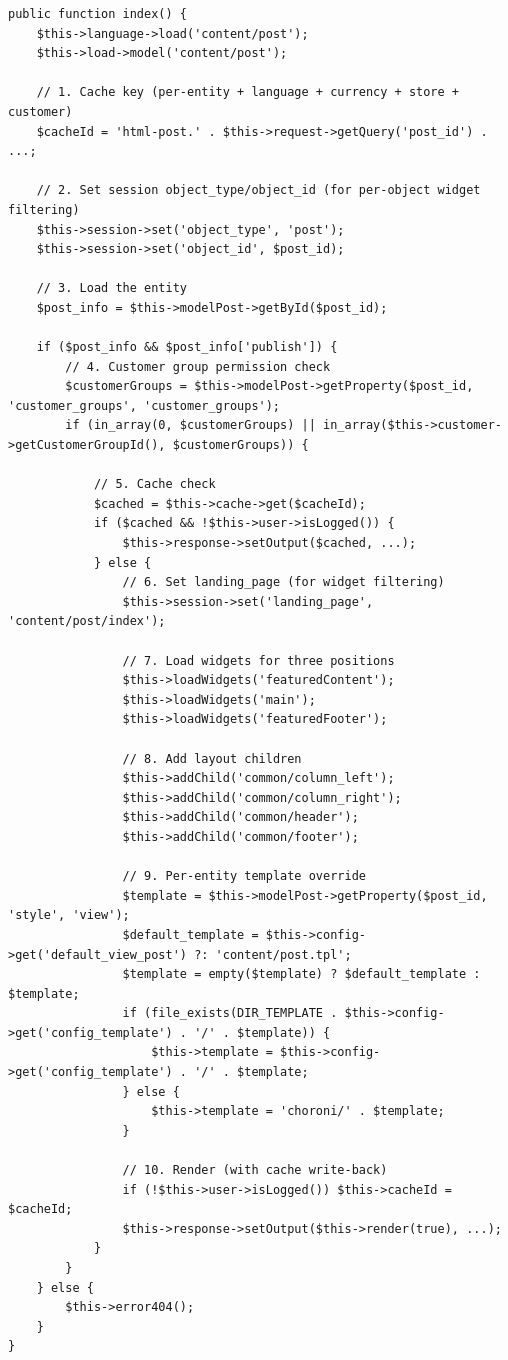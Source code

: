 \documentclass[11pt,a4paper]{article}
\begin{document}
\begin{lstlisting}[caption={The common CMS page pattern (abridged from \texttt{content/post.php}).},label={lst:cms-pattern}]
public function index() {
    $this->language->load('content/post');
    $this->load->model('content/post');

    // 1. Cache key (per-entity + language + currency + store + customer)
    $cacheId = 'html-post.' . $this->request->getQuery('post_id') . ...;

    // 2. Set session object_type/object_id (for per-object widget filtering)
    $this->session->set('object_type', 'post');
    $this->session->set('object_id', $post_id);

    // 3. Load the entity
    $post_info = $this->modelPost->getById($post_id);

    if ($post_info && $post_info['publish']) {
        // 4. Customer group permission check
        $customerGroups = $this->modelPost->getProperty($post_id, 'customer_groups', 'customer_groups');
        if (in_array(0, $customerGroups) || in_array($this->customer->getCustomerGroupId(), $customerGroups)) {

            // 5. Cache check
            $cached = $this->cache->get($cacheId);
            if ($cached && !$this->user->isLogged()) {
                $this->response->setOutput($cached, ...);
            } else {
                // 6. Set landing_page (for widget filtering)
                $this->session->set('landing_page', 'content/post/index');

                // 7. Load widgets for three positions
                $this->loadWidgets('featuredContent');
                $this->loadWidgets('main');
                $this->loadWidgets('featuredFooter');

                // 8. Add layout children
                $this->addChild('common/column_left');
                $this->addChild('common/column_right');
                $this->addChild('common/header');
                $this->addChild('common/footer');

                // 9. Per-entity template override
                $template = $this->modelPost->getProperty($post_id, 'style', 'view');
                $default_template = $this->config->get('default_view_post') ?: 'content/post.tpl';
                $template = empty($template) ? $default_template : $template;
                if (file_exists(DIR_TEMPLATE . $this->config->get('config_template') . '/' . $template)) {
                    $this->template = $this->config->get('config_template') . '/' . $template;
                } else {
                    $this->template = 'choroni/' . $template;
                }

                // 10. Render (with cache write-back)
                if (!$this->user->isLogged()) $this->cacheId = $cacheId;
                $this->response->setOutput($this->render(true), ...);
            }
        }
    } else {
        $this->error404();
    }
}
\end{lstlisting}
\end{document}
